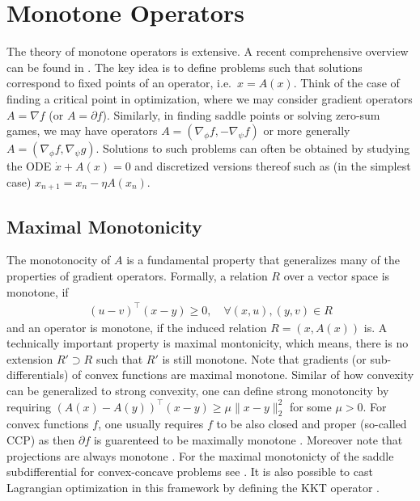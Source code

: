 \documentclass{article}
\begin{document}
\section{Monotone Operators}

The theory of monotone operators is extensive. A recent comprehensive overview can be found in \cite{ryu2016primer}. The key idea is to define problems such that solutions correspond to fixed points of an operator, i.e.~$x = A(x)$. Think of the case of finding a critical point in optimization, where we may consider gradient operators $A=\nabla f$ (or $A=\partial f$). Similarly, in finding saddle points or solving zero-sum games, we may have operators $A=(\nabla_\phi f, - \nabla_\psi f)$ or more generally $A=(\nabla_\phi f, \nabla_\psi g)$. Solutions to such problems can often be obtained by studying the ODE $\dot x + A(x) = 0$ and discretized versions thereof such as (in the simplest case) $x_{n+1} = x_{n} - \eta A(x_n)$. 

\subsection{Maximal Monotonicity} 

The monotonocity of $A$ is a fundamental property that generalizes many of the properties of gradient operators. Formally, a relation $R$ over a vector space is monotone, if 
\begin{align}
(u-v)^\top (x-y) \ge 0, \quad \forall (x,u), (y,v) \in R
\end{align}
and an operator is monotone, if the induced relation $R=(x,A(x))$ is. A technically important property is maximal montonicity, which means, there is no extension $R' \supset R$ such that $R'$ is still monotone. Note that gradients (or sub-differentials) of convex functions are maximal monotone. Similar of how convexity can be generalized to strong convexity, one can define strong monotoncity by requiring $(A(x)-A(y))^\top (x-y) \ge \mu \| x-y\|^2_2$ for some $\mu >0$. For convex functions $f$, one usually requires $f$ to be also closed and proper (so-called CCP) as then $\partial f$ is guarenteed to be maximally monotone \cite[Section 4.2]{ryu2016primer}. Moreover note that projections are always monotone \cite[Section 4.3]{ryu2016primer}. For the maximal monotonicty of the saddle subdifferential for convex-concave problems see \cite{rockafellar1976monotone}. It is also possible to cast Lagrangian optimization in this framework by defining the KKT operator \cite[Section 4.4]{ryu2016primer}.
\end{document}
